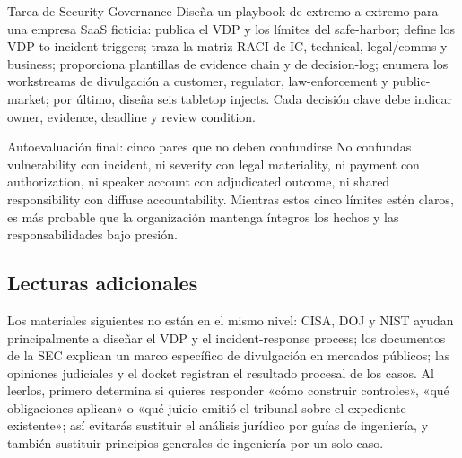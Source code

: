 \begin{importantbox}{Tarea de Security Governance}
Diseña un playbook de extremo a extremo para una empresa SaaS ficticia: publica el VDP y los límites del safe-harbor; define los VDP-to-incident triggers; traza la matriz RACI de IC, technical, legal/comms y business; proporciona plantillas de evidence chain y de decision-log; enumera los workstreams de divulgación a customer, regulator, law-enforcement y public-market; por último, diseña seis tabletop injects. Cada decisión clave debe indicar owner, evidence, deadline y review condition.
\end{importantbox}

\begin{knowledgebox}{Autoevaluación final: cinco pares que no deben confundirse}
No confundas vulnerability con incident, ni severity con legal materiality, ni payment con authorization, ni speaker account con adjudicated outcome, ni shared responsibility con diffuse accountability. Mientras estos cinco límites estén claros, es más probable que la organización mantenga íntegros los hechos y las responsabilidades bajo presión.
\end{knowledgebox}

\subsection{Lecturas adicionales}

Los materiales siguientes no están en el mismo nivel: CISA, DOJ y NIST ayudan principalmente a diseñar el VDP y el incident-response process; los documentos de la SEC explican un marco específico de divulgación en mercados públicos; las opiniones judiciales y el docket registran el resultado procesal de los casos. Al leerlos, primero determina si quieres responder «cómo construir controles», «qué obligaciones aplican» o «qué juicio emitió el tribunal sobre el expediente existente»; así evitarás sustituir el análisis jurídico por guías de ingeniería, y también sustituir principios generales de ingeniería por un solo caso.

